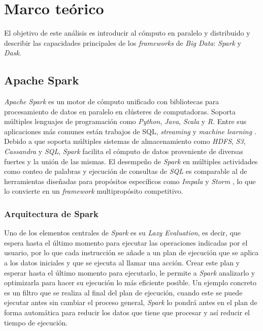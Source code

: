 \chapter{Marco teórico}

\noindent El objetivo de este análisis es introducir al cómputo en paralelo y distribuido y describir las capacidades principales de los \textit{frameworks}  de \textit{Big Data}: \textit{Spark} y \textit{Dask}.

\newpage


\section{Apache Spark}

\textit{Apache Spark} es un motor de cómputo unificado con bibliotecas para procesamiento de datos en paralelo en clústeres de computadoras. Soporta múltiples lenguajes de programación como \textit{Python}, \textit{Java}, \textit{Scala} y \textit{R}. Entre sus aplicaciones más comunes están trabajos de SQL, \textit{streaming} y \textit{machine learning} \cite{sparkguide}. Debido a que soporta múltiples sistemas de almacenamiento como \textit{HDFS}, \textit{S3}, \textit{Cassandra} y \textit{SQL}, \textit{Spark} facilita el cómputo de datos proveniente de diversas fuertes y la unión de las mismas. El desempeño de \textit{Spark} en múltiples actividades como conteo de palabras y ejecución de consultas de \textit{SQL} es comparable al de herramientas diseñadas para propósitos específicos como \textit{Impala} y \textit{Storm} \cite{sparkberkeley}, lo que lo convierte en un \textit{framework} multipropósito competitivo.

\subsection{Arquitectura de Spark}

Uno de los elementos centrales de \textit{Spark} es su \textit{Lazy Evaluation}, es decir, que espera hasta el último momento para ejecutar las operaciones indicadas por el usuario, por lo que cada instrucción se añade a un plan de ejecución que se aplica a los datos iniciales y que se ejecuta al llamar una acción. Crear este plan y esperar hasta el último momento para ejecutarlo, le permite a \textit{Spark} analizarlo y optimizarla para hacer su ejecución lo más eficiente posible. Un ejemplo concreto es un filtro que se realiza al final del plan de ejecución, cuando este se puede ejecutar antes sin cambiar el proceso general, \textit{Spark} lo pondrá antes en el plan de forma automática para reducir los datos que tiene que procesar y así reducir el tiempo de ejecución.

